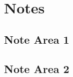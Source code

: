 
\chapter{Notes}
\label{loc:Notes}



\section{Note Area 1}
\label{loc:Notes_1}



\section{Note Area 2}
\label{loc:Notes_2}


